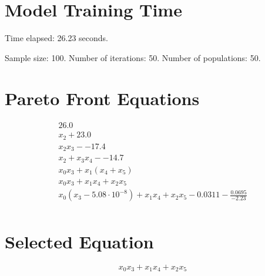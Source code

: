 \documentclass{article}
\begin{document}
\section*{Model Training Time}
Time elapsed: 26.23 seconds.

Sample size: 100.
Number of iterations: 50.
Number of populations: 50.

\section*{Pareto Front Equations}
\begin{align*}
26.0 \\
x_{2} + 23.0 \\
x_{2} x_{3} - -17.4 \\
x_{2} + x_{3} x_{4} - -14.7 \\
x_{0} x_{3} + x_{1} \left(x_{4} + x_{5}\right) \\
x_{0} x_{3} + x_{1} x_{4} + x_{2} x_{5} \\
x_{0} \left(x_{3} - 5.08 \cdot 10^{-8}\right) + x_{1} x_{4} + x_{2} x_{5} - 0.0311 - \frac{0.0695}{-2.23} \\
\end{align*}

\section*{Selected Equation}
\[ x_{0} x_{3} + x_{1} x_{4} + x_{2} x_{5} \]
\end{document}
